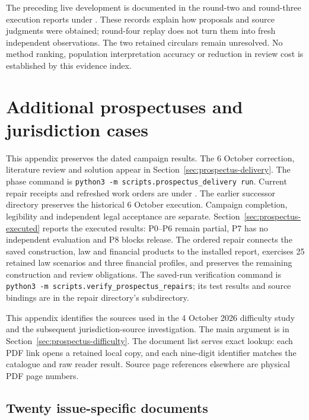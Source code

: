 \documentclass[12pt,a4paper,oneside,openany]{book}
\begin{document}
The preceding live development is documented in the round-two and round-three
execution reports under . These records explain how
proposals and source judgments were obtained; round-four replay does not turn
them into fresh independent observations. The two retained circulars remain
unresolved. No method ranking, population interpretation accuracy or reduction
in review cost is established by this evidence index.

\chapter{Additional prospectuses and jurisdiction cases}
\label{app:prospectus-difficulty}

This appendix preserves the dated campaign results. The 6 October correction,
literature review and solution appear in Section~\ref{sec:prospectus-delivery}.
The phase command is \texttt{python3 -m scripts.prospectus\_delivery run}.
Current repair receipts and refreshed work orders are under
.
The earlier successor directory preserves the historical 6 October execution.
Campaign completion, legibility and independent legal acceptance are separate.
Section~\ref{sec:prospectus-executed} reports the executed results: P0--P6
remain partial, P7 has no independent evaluation and P8 blocks release.
The ordered repair connects the saved construction, law and financial products
to the installed report, exercises 25 retained law scenarios and three financial
profiles, and preserves the remaining construction and review obligations.
The saved-run verification command is
\texttt{python3 -m scripts.verify\_prospectus\_repairs};
its test results and source bindings are in the repair directory's
 subdirectory.

This appendix identifies the sources used in the 4 October 2026 difficulty
study and the subsequent jurisdiction-source investigation. The main
argument is in Section~\ref{sec:prospectus-difficulty}. The document list
serves exact lookup: each PDF link opens a retained local copy, and each
nine-digit identifier matches the catalogue and raw reader result. Source
page references elsewhere are physical PDF page numbers.

\section{Twenty issue-specific documents}
\end{document}
